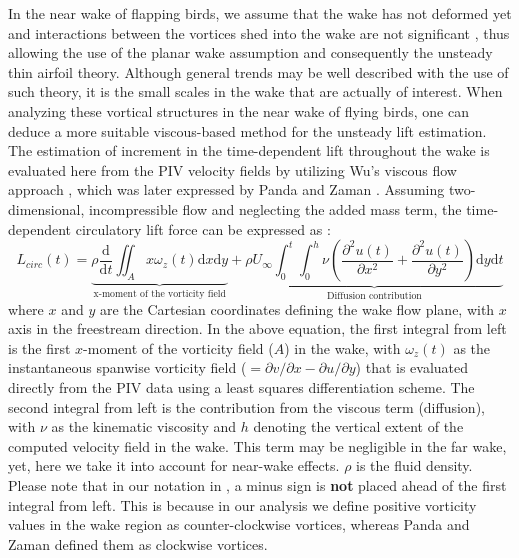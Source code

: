\documentclass[12pt,a4paper]{article}
\begin{document}
In the near wake of flapping birds, we assume that the wake has not deformed yet and interactions between the vortices shed into the wake are not significant \cite{Stalnov2015}, thus allowing the use of the planar wake assumption and consequently the unsteady thin airfoil theory. 
Although general trends may be well described with the use of such theory, it is the small scales in the wake that are actually of interest. 
When analyzing these vortical structures in the near wake of flying birds, one can deduce a more suitable viscous-based method for the unsteady lift estimation. 
The estimation of increment in the time-dependent lift throughout the wake is evaluated here from the PIV velocity fields by utilizing Wu's viscous flow approach \cite{Wu1981}, which was later expressed by Panda and Zaman \cite{Panda1994}.
Assuming two-dimensional, incompressible flow and neglecting the added mass term, the time-dependent circulatory lift force can be expressed as \cite{Panda1994}:
\begin{equation}
L_{circ}(t) = \underbrace{\rho \frac{\mathrm{d}}{\mathrm{d}t}\iint_Ax\omega_z(t)\mathrm{d}x\mathrm{d}y}_{\text{x-moment of the vorticity field}} + \underbrace{\rho U_\infty \int_0^t \int_0^h\nu \left( \frac{\partial^2u(t)}{\partial x^2} + \frac{\partial^2u(t)}{\partial y^2} \right)\mathrm{d}y \mathrm{d}t}_{\text{Diffusion contribution}}
\label{eq:inst_Lift}
\end{equation}
where $x$ and $y$ are the Cartesian coordinates defining the wake flow plane, with $x$ axis in the freestream direction. In the above equation, the first integral from left is the first $x$-moment of the vorticity field ($A$) in the wake, with $\omega_z(t)$ as the instantaneous spanwise vorticity field ($=\partial v/\partial x - \partial u/\partial y$) that is evaluated directly from the PIV data using a least squares differentiation scheme. The second integral from left is the contribution from the viscous term (diffusion), with $\nu$ as the kinematic viscosity and $h$ denoting the vertical extent of the computed velocity field in the wake. This term may be negligible in the far wake, yet, here we take it into account for near-wake effects. $\rho$ is the fluid density.
Please note that in our notation in , a minus sign is \textbf{not} placed ahead of the first integral from left. This is because in our analysis we define positive vorticity values in the wake region as counter-clockwise vortices, whereas Panda and Zaman \cite{Panda1994} defined them as clockwise vortices.
\end{document}
